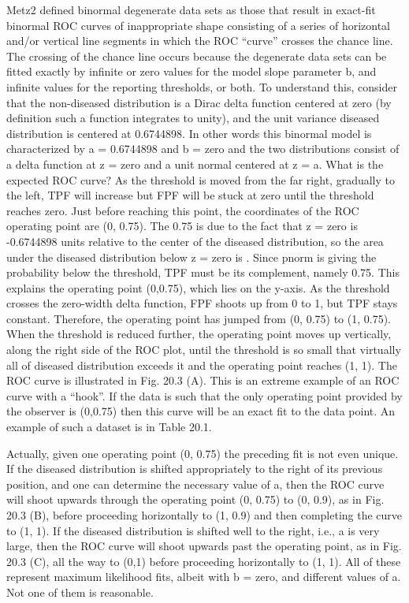 \documentclass[
]{book}
\begin{document}
Metz2 defined binormal degenerate data sets as those that result in exact-fit binormal ROC curves of inappropriate shape consisting of a series of horizontal and/or vertical line segments in which the ROC ``curve'' crosses the chance line. The crossing of the chance line occurs because the degenerate data sets can be fitted exactly by infinite or zero values for the model slope parameter b, and infinite values for the reporting thresholds, or both. To understand this, consider that the non-diseased distribution is a Dirac delta function centered at zero (by definition such a function integrates to unity), and the unit variance diseased distribution is centered at 0.6744898. In other words this binormal model is characterized by a = 0.6744898 and b = zero and the two distributions consist of a delta function at z = zero and a unit normal centered at z = a. What is the expected ROC curve? As the threshold is moved from the far right, gradually to the left, TPF will increase but FPF will be stuck at zero until the threshold reaches zero. Just before reaching this point, the coordinates of the ROC operating point are (0, 0.75). The 0.75 is due to the fact that z = zero is -0.6744898 units relative to the center of the diseased distribution, so the area under the diseased distribution below z = zero is . Since pnorm is giving the probability below the threshold, TPF must be its complement, namely 0.75. This explains the operating point (0,0.75), which lies on the y-axis. As the threshold crosses the zero-width delta function, FPF shoots up from 0 to 1, but TPF stays constant. Therefore, the operating point has jumped from (0, 0.75) to (1, 0.75). When the threshold is reduced further, the operating point moves up vertically, along the right side of the ROC plot, until the threshold is so small that virtually all of diseased distribution exceeds it and the operating point reaches (1, 1). The ROC curve is illustrated in Fig. 20.3 (A). This is an extreme example of an ROC curve with a ``hook''. If the data is such that the only operating point provided by the observer is (0,0.75) then this curve will be an exact fit to the data point. An example of such a dataset is in Table 20.1.

Actually, given one operating point (0, 0.75) the preceding fit is not even unique. If the diseased distribution is shifted appropriately to the right of its previous position, and one can determine the necessary value of a, then the ROC curve will shoot upwards through the operating point (0, 0.75) to (0, 0.9), as in Fig. 20.3 (B), before proceeding horizontally to (1, 0.9) and then completing the curve to (1, 1). If the diseased distribution is shifted well to the right, i.e., a is very large, then the ROC curve will shoot upwards past the operating point, as in Fig. 20.3 (C), all the way to (0,1) before proceeding horizontally to (1, 1). All of these represent maximum likelihood fits, albeit with b = zero, and different values of a. Not one of them is reasonable.
\end{document}
